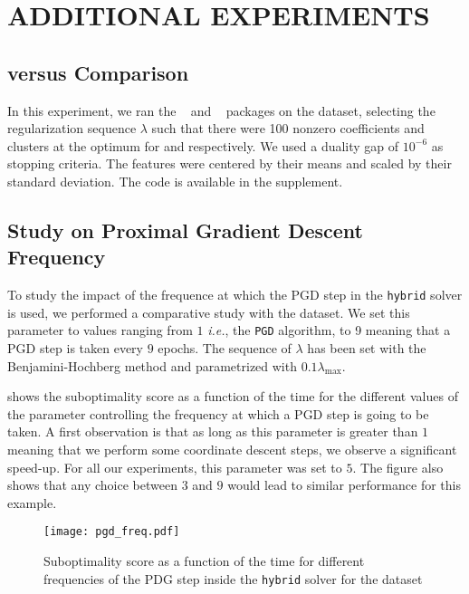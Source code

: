 \section{ADDITIONAL EXPERIMENTS}\label{sec:add_expes}

\subsection{ versus  Comparison}
\label{sec:slope-vs-glmnet}

In this experiment, we ran the ~\parencite{friedman2022} and ~\parencite{larsson2022d} packages on the  dataset, selecting the regularization sequence \(\lambda\) such that there were 100 nonzero coefficients and clusters at the optimum for  and  respectively.
We used a duality gap of \(10^{-6}\) as stopping criteria.
The features were centered by their means and scaled by their standard deviation.
The code is available in the supplement.

\subsection{Study on Proximal Gradient Descent Frequency}
\label{sec:pgd-freq-study}

To study the impact of the frequence at which the PGD step in the \texttt{hybrid} solver is used, we performed a comparative study with the  dataset.
We set this parameter to values ranging from $1$ \textit{i.e.}, the \texttt{PGD} algorithm, to 9 meaning that a PGD step is taken every $9$ epochs.
The sequence of $\lambda$ has been set with the Benjamini-Hochberg method and parametrized with $0.1 \lambda_{\text{max}}$.

 shows the suboptimality score as a function of the time for the different values of the parameter controlling the frequency at which a PGD step is going to be taken.
A first observation is that as long as this parameter is greater than $1$ meaning that we perform some coordinate descent steps, we observe a significant speed-up.
For all our experiments, this parameter was set to $5$.
The figure also shows that any choice between $3$ and $9$ would lead to similar performance for this example.

\begin{figure*}[htb]
  \centering
    \texttt{[image: pgd\_freq.pdf]}%
    \caption{Suboptimality score as a function of the time for different frequencies of the PDG step inside the \texttt{hybrid} solver for the  dataset}
  \label{fig:pgd_freq}
\end{figure*}


